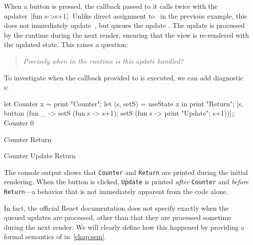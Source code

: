 When a button is pressed, the callback passed to it calls  twice with the updater~|fun s->s+1|.
Unlike direct assignment to~ in the previous example, this does not immediately update~, but queues the update \citep{Met25Queueing}.
The update is processed by the runtime during the next render, ensuring that the view is re-rendered with the updated state.
This raises a question:
\begin{quote}
  \emph{Precisely \emph{when} in the runtime is this update handled?}
\end{quote}

To investigate when the callback provided to  is executed, we can add diagnostic s:
\begin{center}
  \begin{minipage}{.6\linewidth}
    \begin{reactcode}
let Counter x =
  print "Counter";
  let (s, setS) = useState x in
  print "Return";
  [s, button (fun _ ->
    setS (fun s -> s+1);
    setS (fun s -> print "Update"; s+1))];;
Counter 0
    \end{reactcode}
  \end{minipage}
  \begin{minipage}{.3\linewidth}
    \begin{console}[frame=topline]
Counter
Return
    \end{console}
    {\footnotesize\vspace{-.6\baselineskip}\hspace{2em} \faHandPointUp[regular]}
    \begin{console}[frame=bottomline, firstnumber=3]
Counter
Update
Return
    \end{console}
  \end{minipage}
\end{center}
The console output shows that \verb+Counter+ and \verb+Return+ are printed during the initial rendering.
When the button is clicked, \verb+Update+ is printed \emph{after} \verb+Counter+ and \emph{before} \verb+Return+---a behavior that is not immediately apparent from the code alone.

In fact, the official React documentation does not specify exactly when the queued updates are processed, other than that they are processed sometime during the next render.
We will clearly define how this happened by providing a formal semantics of \Rtrace{} in~\cref{chap:sem}.


